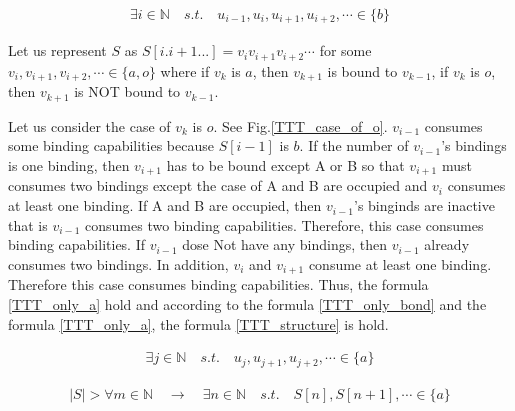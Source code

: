 \documentclass[runningheads]{llncs}
\begin{document}
\begin{eqnarray}
  \exists i \in \mathbb{N} \quad s.t. \quad u_{i-1} , u_i , u_{i+1} , u_{i+2} , \cdots \in \{ b \}
  \label{TTT_only_bond}
\end{eqnarray}


Let us represent $S$ as $S[i.i+1...] = v_i v_{i+1} v_{i+2} \cdots$ for some $v_i, v_{i+1}, v_{i+2}, \cdots \in \{ a, o\}$ where if $v_k$ is $a$, then $v_{k+1}$ is bound to $v_{k-1}$, if $v_k$ is $o$, then $v_{k+1}$ is NOT bound to $v_{k-1}$.


Let us consider the case of $v_k$ is $o$. See Fig.\ref{TTT_case_of_o}. $v_{i-1}$ consumes some binding capabilities because $S[i-1]$ is $b$. If the number of $v_{i-1}$'s bindings is one binding, then $v_{i+1}$ has to be bound except A or B so that $v_{i+1}$ must consumes two bindings except the case of A and B are occupied and $v_i$ consumes at least one binding. If A and B are occupied, then $v_{i-1}$'s binginds are inactive that is $v_{i-1}$ consumes two binding capabilities. Therefore, this case consumes binding capabilities. If $v_{i-1}$ dose Not have any bindings, then $v_{i-1}$ already consumes two bindings. In addition, $v_i$ and $v_{i+1}$ consume at least one binding. Therefore this case consumes binding capabilities. Thus, the formula \ref{TTT_only_a} hold and according to the formula \ref{TTT_only_bond} and the formula \ref{TTT_only_a}, the formula \ref{TTT_structure} is hold.

\begin{eqnarray}
  \exists j \in \mathbb{N} \quad s.t. \quad u_j , u_{j+1} , u_{j+2} , \cdots \in \{ a \}
  \label{TTT_only_a}
\end{eqnarray}

\begin{eqnarray}
  | S | > \forall m \in \mathbb{N} \quad \to \quad \exists n \in \mathbb{N} \quad s.t. \quad S[n], S[n+1], \cdots \in \{ a \}
  \label{TTT_structure}
\end{eqnarray}
\end{document}
